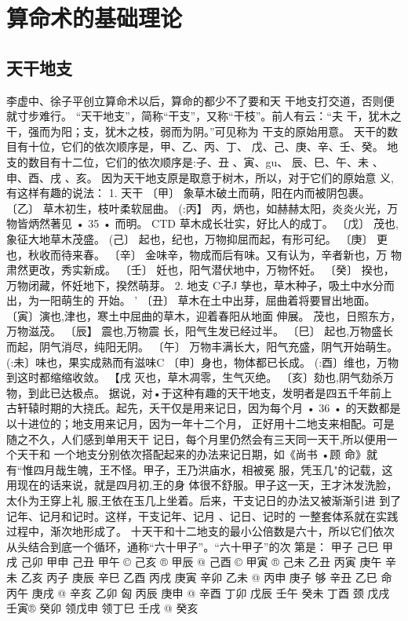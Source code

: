 \chapter{算命术的基础理论}
\section{天干地支}
李虚中、徐子平创立算命术以后，算命的都少不了要和天
干地支打交道，否则便就寸步难行。
“天干地支”，简称“干支”，又称“干枝”。前人有云：“夫
干，犹木之干，强而为阳；支，犹木之枝，弱而为阴。”可见称为
干支的原始用意。
天干的数目有十位，它们的依次顺序是，甲、乙、丙、丁、
戊、己、庚、辛、壬、癸。
地支的数目有十二位，它们的依次顺序是:子、丑 、寅、gu、
辰、巳、午、未 、申、酉、戌 、亥。
因为天干地支原是取意于树木，所以，对于它们的原始意
义,有这样有趣的说法：
1. 天干
〔甲〕 象草木破土而萌，阳在内而被阴包裹。
〔乙〕 草木初生，枝叶柔软屈曲。
(:丙】 丙，炳也，如赫赫太阳，炎炎火光，万物皆炳然著见
• 35 •
而明。
CTD 草木成长壮实，好比人的成丁。
〔戊〕 茂也,象征大地草木茂盛。
(己〕 起也，纪也，万物抑屈而起，有形可纪。
〔庚〕 更也，秋收而待来春。
〔辛〕 金味辛，物成而后有味。又有认为，辛者新也，万
物肃然更改，秀实新成。
〔壬〕 妊也，阳气潜伏地中，万物怀妊。
〔癸〕 揆也，万物闭藏，怀妊地下，揆然萌芽。
2. 地支
C子J 孳也，草木种子，吸土中水分而出，为一阳萌生的
开始。 '
〔丑〕 草木在土中出芽，屈曲着将要冒出地面。
〔寅〕演也,津也，寒土中屈曲的草木，迎着春阳从地面
伸展。
茂也，日照东方，万物滋茂。
〔辰】 震也,万物震 长，阳气生发已经过半。
〔巳〕 起也,万物盛长而起，阴气消尽，纯阳无阴。
〔午〕 万物丰满长大，阳气充盛，阴气开始萌生。
(:未〕味也，果实成熟而有滋味C
〔申〕身也，物体都已长成。
(:酉〕维也，万物到这时都缩缩收敛。
【戌 灭也，草木凋零，生气灭绝。
〔亥〕劾也,阴气劾杀万物，到此已达极点。
据说，对•于这种有趣的天干地支，发明者是四五千年前上
古轩辕时期的大挠氏。起先，夭干仅是用来记日，因为每个月
• 36 •
的天数都是以十进位的；地支用来记月，因为一年十二个月，
正好用十二地支来相配。可是随之不久，人们感到单用天干
记日，每个月里仍然会有三天同一天干,所以便用一个天干和
一个地支分别依次搭配起来的办法来记日期，如《尚书 •顾
命》就有“惟四月哉生魄，王不怪。甲子，王乃洪庙水，相被冕
服，凭玉几"的记载，这用现在的话来说，就是四月初,王的身
体很不舒服。甲子这一天，王才沐发洗脸，太仆为王穿上礼
服,王依在玉几上坐着。后来，干支记日的办法又被渐渐引进
到了记年、记月和记时。这样，干支记年、记月 、记日、记时的
一整套体系就在实践过程中，渐次地形成了。
十天干和十二地支的最小公倍数是六十，所以它们依次
从头结合到底一个循环，通称“六十甲子”。“六十甲子”的次
第是：
甲子
己巳
甲戌
己卯
甲申
己丑
甲午 ©
己亥 ®
甲辰 @
己酉 ©
甲寅 ®
己未
乙丑 丙寅
庚午 辛未
乙亥 丙子
庚辰 辛巳
乙酉 丙戌
庚寅 辛卯
乙未 @ 丙申
庚子 够 辛丑
乙巳 命 丙午
庚戌 @ 辛亥
乙卯 匈 丙辰
庚申 @ 辛酉
丁卯 戊辰
壬午 癸未
丁酉 颈 戊戌
壬寅® 癸卯
领戊申
领丁巳
壬戌 @ 癸亥


